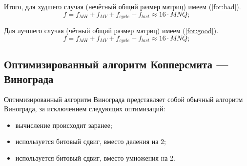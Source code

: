 Итого, для худшего случая (нечётный общий размер матриц) имеем (\ref{for:bad}).
\begin{equation}
	\label{for:bad}
	f =  f_{MH} + f_{MV} + f_{cycle} + f_{last}\approx 16 \cdot MNQ;
\end{equation}

Для лучшего случая (чётный общий размер матриц) имеем (\ref{for:good}).
\begin{equation}
	\label{for:good}
	f =  f_{MH} + f_{MV} + f_{cycle} + f_{last} \approx 16 \cdot MNQ;
\end{equation}


\subsection{Оптимизированный алгоритм Копперсмита — Винограда}

Оптимизированный алгоритм Винограда представляет собой обычный алгоритм Винограда, за исключением следующих оптимизаций:
\begin{itemize}
	\item вычисление происходит заранее;
	\item используется битовый сдвиг, вместо деления на 2;
	\item используется битовый сдвиг, вместо умножения на 2.
\end{itemize}



